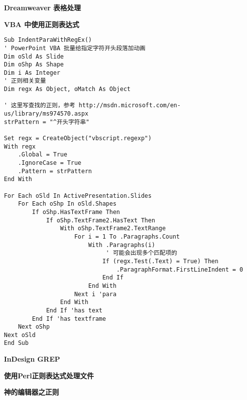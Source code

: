 \documentclass[12pt,a4paper,twoside]{ctexart}
\begin{document}
\noindent\textbf{Dreamweaver 表格处理} \par

\noindent\textbf{VBA 中使用正则表达式} \par

\begin{lstlisting}[language=VBScript]
Sub IndentParaWithRegEx()
' PowerPoint VBA 批量给指定字符开头段落加动画
Dim oSld As Slide
Dim oShp As Shape
Dim i As Integer
' 正则相关变量
Dim regx As Object, oMatch As Object

' 这里写查找的正则，参考 http://msdn.microsoft.com/en-us/library/ms974570.aspx
strPattern = "^开头字符串"

Set regx = CreateObject("vbscript.regexp")
With regx
    .Global = True
    .IgnoreCase = True
    .Pattern = strPattern
End With
    
For Each oSld In ActivePresentation.Slides
    For Each oShp In oSld.Shapes
        If oShp.HasTextFrame Then
            If oShp.TextFrame2.HasText Then
                With oShp.TextFrame2.TextRange
                    For i = 1 To .Paragraphs.Count
                        With .Paragraphs(i)
                             ' 可能会出现多个匹配项的
                            If (regx.Test(.Text) = True) Then
                                .ParagraphFormat.FirstLineIndent = 0
                            End If
                        End With
                    Next i 'para
                End With
            End If 'has text
        End If 'has textframe
    Next oShp
Next oSld
End Sub  
\end{lstlisting}

\noindent\textbf{InDesign GREP} \par

\noindent\textbf{使用Perl正则表达式处理文件} \par

\noindent\textbf{神的编辑器之正则} \par
\end{document}
